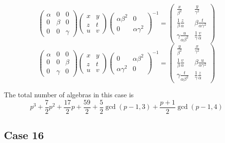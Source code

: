 \documentclass[10pt,thmsa]{article}
\begin{document}
\[
\left( 
\begin{array}{lll}
\alpha & 0 & 0 \\ 
0 & \beta & 0 \\ 
0 & 0 & \gamma%
\end{array}
\right) \left( 
\begin{array}{ll}
x & y \\ 
z & t \\ 
u & v%
\end{array}
\right) \left( 
\begin{array}{ll}
\alpha \beta ^2 & 0 \\ 
0 & \alpha \gamma ^2%
\end{array}
\right) ^{-1}=\allowbreak \left( 
\begin{array}{cc}
\frac x{\beta ^2} & \frac y{\gamma ^2} \\ 
\frac 1\beta \frac z\alpha & \beta \frac t{\alpha \gamma ^2} \\ 
\gamma \frac u{\alpha \beta ^2} & \frac 1\gamma \frac v\alpha%
\end{array}
\right) 
\]
\[
\left( 
\begin{array}{lll}
\alpha & 0 & 0 \\ 
0 & 0 & \beta \\ 
0 & \gamma & 0%
\end{array}
\right) \left( 
\begin{array}{ll}
x & y \\ 
z & t \\ 
u & v%
\end{array}
\right) \left( 
\begin{array}{ll}
0 & \alpha \beta ^2 \\ 
\alpha \gamma ^2 & 0%
\end{array}
\right) ^{-1}=\allowbreak \left( 
\begin{array}{cc}
\frac y{\beta ^2} & \frac x{\gamma ^2} \\ 
\frac 1\beta \frac v\alpha & \beta \frac u{\alpha \gamma ^2} \\ 
\gamma \frac t{\alpha \beta ^2} & \frac 1\gamma \frac z\alpha%
\end{array}
\right) 
\]

The total number of algebras in this case is 
\[
\allowbreak p^{3}+\frac{7}{2}p^{2}+\frac{17}{2}p+\frac{59}{2}+\frac{5}{2}%
\gcd (p-1,3)+\frac{p+1}{2}\gcd (p-1,4) 
\]

\subsection{Case 16}
\end{document}
